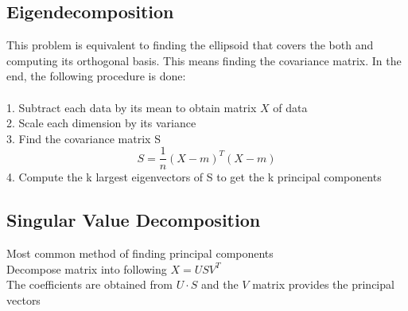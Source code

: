 \documentclass[twoside,11pt]{article}
\theoremstyle{definition}
\begin{document}
\subsection{Eigendecomposition}

This problem is equivalent to finding the ellipsoid that covers the both and computing its orthogonal basis. This means finding the covariance matrix. In the end, the following procedure is done:\\
\\
1. Subtract each data by its mean to obtain matrix $X$ of data\\
2. Scale each dimension by its variance\\
3. Find the covariance matrix S
\[
S = \frac{1}{n} (X-m)^T(X-m)
\]
4. Compute the k largest eigenvectors of S to get the k principal components

\subsection{Singular Value Decomposition}

Most common method of finding principal components\\
Decompose matrix into following $X=USV^T$\\
The coefficients are obtained from $U \cdot S$ and the $V$ matrix provides the principal vectors
\end{document}
